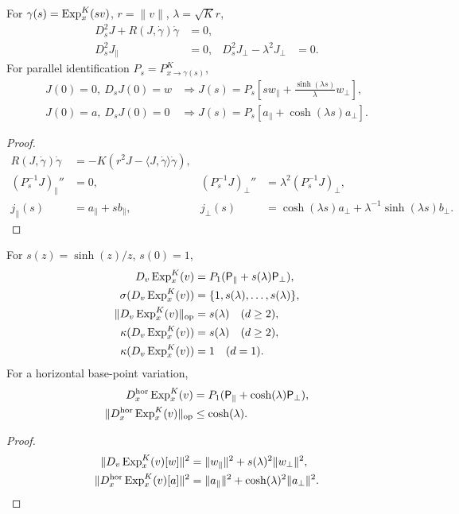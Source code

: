 \begin{lemma}
\label{lem:rigid-jacobi-ivp}
For $\gamma(s)=\operatorname{Exp}_x^K(sv)$, $r=\|v\|$, $\lambda=\sqrt Kr$,
\begin{align}
 D_s^2J+R(J,\dot\gamma)\dot\gamma&=0,\\
 D_s^2J_\parallel&=0,&D_s^2J_\perp-\lambda^2J_\perp&=0.
\end{align}
For parallel identification $P_s=P_{x\to\gamma(s)}^K$,
\begin{align}
 J(0)=0,\ D_sJ(0)=w
 &\Longrightarrow
 J(s)=P_s\left[sw_\parallel+\frac{\sinh(\lambda s)}\lambda w_\perp\right],\\
 J(0)=a,\ D_sJ(0)=0
 &\Longrightarrow
 J(s)=P_s\left[a_\parallel+\cosh(\lambda s)a_\perp\right].
\end{align}
\end{lemma}
\begin{proof}
\begin{align}
 R(J,\dot\gamma)\dot\gamma
 &=-K(r^2J-\langle J,\dot\gamma\rangle\dot\gamma),\\
 (P_s^{-1}J)_\parallel''&=0,&
 (P_s^{-1}J)_\perp''&=\lambda^2(P_s^{-1}J)_\perp,\\
 j_\parallel(s)&=a_\parallel+sb_\parallel,&
 j_\perp(s)&=\cosh(\lambda s)a_\perp+
 \lambda^{-1}\sinh(\lambda s)b_\perp.
\end{align}
\end{proof}

\begin{lemma}
\label{lem:exact-jacobi}
For $s(z)=\sinh(z)/z$, $s(0)=1$,
\begin{align}
 D_v\operatorname{Exp}_x^K(v)&=P_1(\mathsf P_\parallel+s(\lambda)\mathsf P_\perp),\\
 \sigma(D_v\operatorname{Exp}_x^K(v))&=\{1,s(\lambda),\ldots,s(\lambda)\},\\
 \|D_v\operatorname{Exp}_x^K(v)\|_{\rm op}&=s(\lambda)\quad(d\ge2),\\
 \kappa(D_v\operatorname{Exp}_x^K(v))&=s(\lambda)\quad(d\ge2),\\
 \kappa(D_v\operatorname{Exp}_x^K(v))&=1\quad(d=1).
\end{align}
For a horizontal base-point variation,
\begin{align}
 D_x^{\rm hor}\operatorname{Exp}_x^K(v)
 &=P_1(\mathsf P_\parallel+\cosh(\lambda)\mathsf P_\perp),\\
 \|D_x^{\rm hor}\operatorname{Exp}_x^K(v)\|_{\rm op}&\le\cosh(\lambda).
\end{align}
\end{lemma}
\begin{proof}
\begin{align}
 \|D_v\operatorname{Exp}_x^K(v)[w]\|^2
 &=\|w_\parallel\|^2+s(\lambda)^2\|w_\perp\|^2,\\
 \|D_x^{\rm hor}\operatorname{Exp}_x^K(v)[a]\|^2
 &=\|a_\parallel\|^2+\cosh(\lambda)^2\|a_\perp\|^2.
\end{align}
\end{proof}

